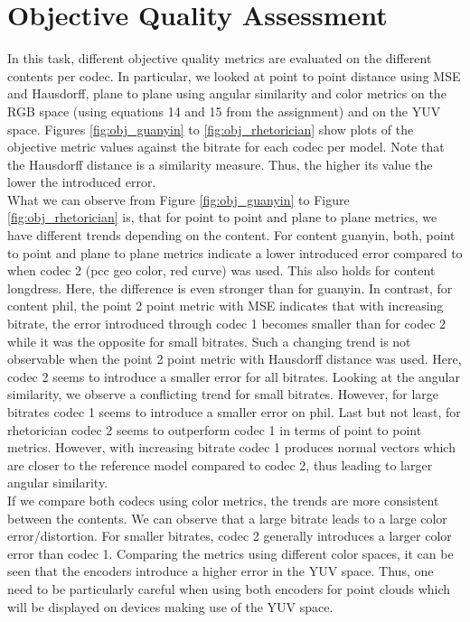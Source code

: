 \documentclass{article}
\begin{document}
\section{Objective Quality Assessment}
In this task, different objective quality metrics are evaluated on the different contents per codec. In particular, we looked at point to point distance using MSE and Hausdorff, plane to plane using angular similarity and color metrics on the RGB space (using equations 14 and 15 from the assignment) and on the YUV space. Figures \ref{fig:obj_guanyin} to \ref{fig:obj_rhetorician} show plots of the objective metric values against the bitrate for each codec per model. Note that the Hausdorff distance is a similarity measure. Thus, the higher its value the lower the introduced error. \\

What we can observe from Figure \ref{fig:obj_guanyin} to Figure \ref{fig:obj_rhetorician} is, that for point to point and plane to plane metrics, we have different trends depending on the content. For content \textsf{guanyin}, both, point to point and plane to plane metrics indicate a lower introduced error compared to when codec 2 (pcc geo color, red curve) was used. This also holds for content \textsf{longdress}. Here, the difference is even stronger than for \textsf{guanyin}. In contrast, for content \textsf{phil}, the point 2 point metric with MSE indicates that with increasing bitrate, the error introduced through codec 1 becomes smaller than for codec 2 while it was the opposite for small bitrates. Such a changing trend is not observable when the point 2 point metric with Hausdorff distance was used. Here, codec 2 seems to introduce a smaller error for all bitrates. Looking at the angular similarity, we observe a conflicting trend for small bitrates. However, for large bitrates codec 1 seems to introduce a smaller error on \textsf{phil}. Last but not least, for \textsf{rhetorician} codec 2 seems to outperform codec 1 in terms of point to point metrics. However, with increasing bitrate codec 1 produces normal vectors which are closer to the reference model compared to codec 2, thus leading to larger angular similarity. \\

 If we compare both codecs using  color metrics, the trends are more consistent between the contents.
 We can observe that a large bitrate leads to a large color error/distortion. For smaller bitrates, codec 2 generally introduces a larger color error than codec 1. Comparing the metrics using different color spaces, it can be seen that the encoders introduce a higher error in the YUV space. Thus, one need to be particularly careful when using both encoders for point clouds which will be displayed on devices making use of the YUV space.\\
 
\end{document}
